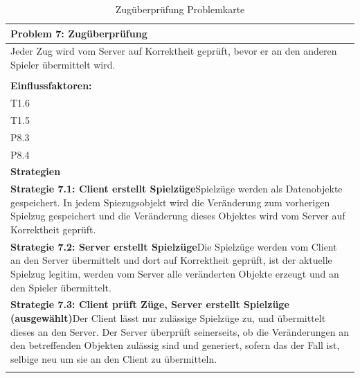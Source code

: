 \documentclass[fontsize=12pt,paper=a4,twoside]{scrartcl}
\begin{document}
\begin{table}[H]
    \centering
    \begin{tabular}{|p{15cm}|}
    \hline
          \textbf{Problem 7: Zugüberprüfung}  \\ \hline
	Jeder Zug wird vom Server auf Korrektheit geprüft, bevor er an den anderen Spieler übermittelt wird. \\
         \\ \hline
          \textbf{Einflussfaktoren: } \\
	T1.6 \\
	T1.5 \\
	P8.3 \\
	P8.4 \\
          \hline
          \textbf{Strategien} \\ \hline
            {}          
           \label{strategie:7.1}     
          \textbf{Strategie 7.1: Client erstellt Spielzüge}Spielzüge werden als Datenobjekte gespeichert. In jedem Spiezugsobjekt wird die Veränderung zum vorherigen Spielzug gespeichert und die Veränderung dieses Objektes wird vom Server auf Korrektheit geprüft.  \\        
  {}          
           \label{strategie:7.2}              
          \textbf{Strategie 7.2: Server erstellt Spielzüge}Die Spielzüge werden vom Client an den Server übermittelt und dort auf Korrektheit geprüft, ist der aktuelle Spielzug legitim, werden vom Server alle veränderten Objekte erzeugt und an den Spieler übermittelt.  \\
	 {}          
           \label{strategie:7.3}     
          \textbf{Strategie 7.3: Client prüft Züge, Server erstellt Spielzüge  (ausgewählt)}Der Client lässt nur zulässige Spielzüge zu, und übermittelt dieses an den Server. Der Server überprüft seinerseits, ob die Veränderungen an den betreffenden Objekten zulässig sind und generiert, sofern das der Fall ist, selbige neu um sie an den Client zu übermitteln.  \\ 
	 \\ \hline
    \end{tabular}

    \caption{Zugüberprüfung Problemkarte}
    \label{tab:ProblemKarte7}
\end{table}
\end{document}

